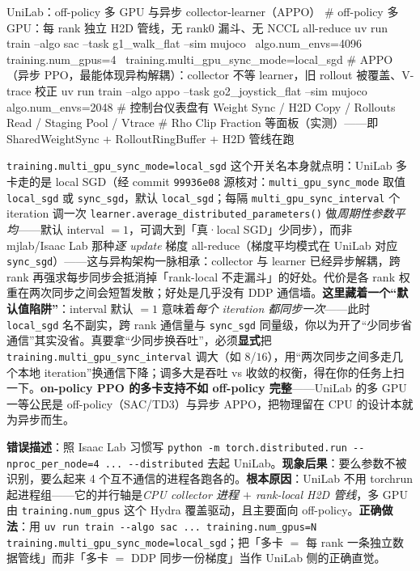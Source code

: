 \begin{codebox}[bash]{UniLab：off-policy 多 GPU 与异步 collector-learner（APPO）}
# off-policy 多 GPU：每 rank 独立 H2D 管线，无 rank0 漏斗、无 NCCL all-reduce
uv run train --algo sac --task g1_walk_flat --sim mujoco \
    algo.num_envs=4096 training.num_gpus=4 \
    training.multi_gpu_sync_mode=local_sgd
# APPO（异步 PPO，最能体现异构解耦）：collector 不等 learner，旧 rollout 被覆盖、V-trace 校正
uv run train --algo appo --task go2_joystick_flat --sim mujoco algo.num_envs=2048
#   控制台仪表盘有 Weight Sync / H2D Copy / Rollouts Read / Staging Pool / Vtrace
#   Rho Clip Fraction 等面板（实测）——即 SharedWeightSync + RolloutRingBuffer + H2D 管线在跑
\end{codebox}

\begin{note}
\verb|training.multi_gpu_sync_mode=local_sgd| 这个开关名本身就点明：UniLab 多卡走的是 local SGD（经 commit \texttt{99936e08} 源核对：\verb|multi_gpu_sync_mode| 取值 \verb|local_sgd| 或 \verb|sync_sgd|，默认 \verb|local_sgd|；每隔 \verb|multi_gpu_sync_interval| 个 iteration 调一次 \verb|learner.average_distributed_parameters()| 做\emph{周期性参数平均}——默认 interval $=1$，可调大到「真·local SGD」少同步），而非 mjlab/Isaac Lab 那种\emph{逐 update} 梯度 all-reduce（梯度平均模式在 UniLab 对应 \verb|sync_sgd|）——这与异构架构一脉相承：collector 与 learner 已经异步解耦，跨 rank 再强求每步同步会抵消掉「rank-local 不走漏斗」的好处。代价是各 rank 权重在两次同步之间会短暂发散；好处是几乎没有 DDP 通信墙。\textbf{这里藏着一个“默认值陷阱”}：interval 默认 $=1$ 意味着\emph{每个 iteration 都同步一次}——此时 \verb|local_sgd| 名不副实，跨 rank 通信量与 \verb|sync_sgd| 同量级，你以为开了“少同步省通信”其实没省。真要拿“少同步换吞吐”，必须\textbf{显式}把 \verb|training.multi_gpu_sync_interval| 调大（如 $8$/$16$），用“两次同步之间多走几个本地 iteration”换通信下降；调多大是吞吐 vs 收敛的权衡，得在你的任务上扫一下。\textbf{on-policy PPO 的多卡支持不如 off-policy 完整}——UniLab 的多 GPU 一等公民是 off-policy（SAC/TD3）与异步 APPO，把物理留在 CPU 的设计本就为异步而生。
\end{note}

\begin{pitfall}[别给 UniLab 的多 GPU 套用 torchrun/\texttt{--distributed} 心智模型]
\textbf{错误描述}：照 Isaac Lab 习惯写 \verb|python -m torch.distributed.run --nproc_per_node=4 ... --distributed| 去起 UniLab。\textbf{现象后果}：要么参数不被识别，要么起来 4 个互不通信的进程各跑各的。\textbf{根本原因}：UniLab 不用 torchrun 起进程组——它的并行轴是\emph{CPU collector 进程 $+$ rank-local H2D 管线}，多 GPU 由 \verb|training.num_gpus| 这个 Hydra 覆盖驱动，且主要面向 off-policy。\textbf{正确做法}：用 \verb|uv run train --algo sac ... training.num_gpus=N training.multi_gpu_sync_mode=local_sgd|；把「多卡 $=$ 每 rank 一条独立数据管线」而非「多卡 $=$ DDP 同步一份梯度」当作 UniLab 侧的正确直觉。
\end{pitfall}

